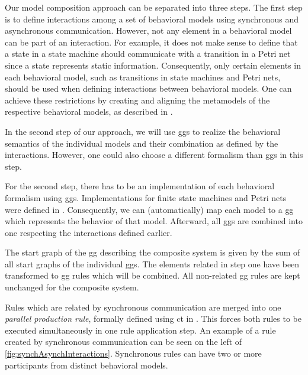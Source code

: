 \documentclass[a4paper]{easychair}
\begin{document}
Our model composition approach can be separated into three steps.
The first step is to define interactions among a set of behavioral models using synchronous and asynchronous communication.
However, not any element in a behavioral model can be part of an interaction.
For example, it does not make sense to define that a state in a state machine should communicate with a transition in a Petri net since a state represents static information.
Consequently, only certain elements in each behavioral model, such as transitions in state machines and Petri nets, should be used when defining interactions between behavioral models.
One can achieve these restrictions by creating and aligning the metamodels of the respective behavioral models, as described in \cite{krauterBehavioralConsistencyHeterogeneous2021}.

In the second step of our approach, we will use \glspl{gg} to realize the behavioral semantics of the individual models and their combination as defined by the interactions.
However, one could also choose a different formalism than \glspl{gg} in this step.

For the second step, there has to be an implementation of each behavioral formalism using \glspl{gg}.
Implementations for finite state machines and Petri nets were defined in \cite{krauterBehavioralConsistencyHeterogeneous2021}.
Consequently, we can (automatically) map each model to a \gls{gg} which represents the behavior of that model.
Afterward, all \glspl{gg} are combined into one respecting the interactions defined earlier.

The start graph of the \gls{gg} describing the composite system is given by the sum of all start graphs of the individual \glspl{gg}.
The elements related in step one have been transformed to \gls{gg} rules which will be combined.
All non-related \gls{gg} rules are kept unchanged for the composite system.

Rules which are related by synchronous communication are merged into one \textit{parallel production rule}, formally defined using \gls{ct} in \cite[Def. 3.2.7]{baldanConcurrentSemanticsAlgebraic1999}.
This forces both rules to be executed simultaneously in one rule application step. 
An example of a rule created by synchronous communication can be seen on the left of \autoref{fig:synchAsynchInteractions}.
Synchronous rules can have two or more participants from distinct behavioral models.  
\end{document}
